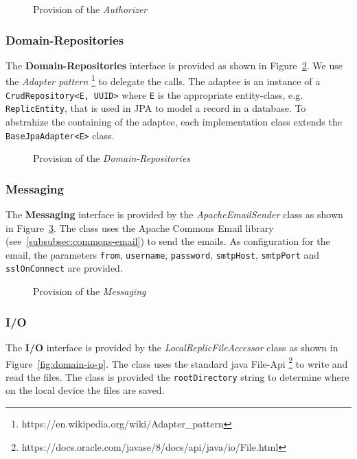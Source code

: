 \begin{figure}
    \centering

    \caption{Provision of the \textit{Authorizer}}
    \label{fig:inter-authorizer-p}
\end{figure}

\subsubsection{Domain-Repositories}
The \textbf{Domain-Repositories} interface is provided as shown in Figure~\ref{fig:domain-repositories-p}.
We use the \textit{Adapter pattern} \footnote{https://en.wikipedia.org/wiki/Adapter_pattern} to delegate the calls. \newline
The adaptee is an instance of a \texttt{CrudRepository<E, UUID>} where \texttt{E} is the appropriate entity-class, e.g. \texttt{ReplicEntity}, that is used in JPA to model a record in a database.
To abstrahize the containing of the adaptee, each implementation class extends the \texttt{BaseJpaAdapter<E>} class.

\begin{figure}
    \centering

    \caption{Provision of the \textit{Domain-Repositories}}
    \label{fig:domain-repositories-p}
\end{figure}

\subsubsection{Messaging}
The \textbf{Messaging} interface is provided by the \textit{ApacheEmailSender} class as shown in Figure~\ref{fig:domain-messaging-p}.
The class uses the Apache Commons Email library (see~\ref{subsubsec:commons-email}) to send the emails.
As configuration for the email, the parameters \texttt{from}, \texttt{username}, \texttt{password}, \texttt{smtpHost}, \texttt{smtpPort} and \texttt{sslOnConnect} are provided.

\begin{figure}
    \centering

    \caption{Provision of the \textit{Messaging}}
    \label{fig:domain-messaging-p}
\end{figure}

\subsubsection{I/O}
The \textbf{I/O} interface is provided by the \textit{LocalReplicFileAccessor} class as shown in Figure~\ref{fig:domain-io-p}.
The class uses the standard java File-Api \footnote{https://docs.oracle.com/javase/8/docs/api/java/io/File.html} to write and read the files.
The class is provided the \texttt{rootDirectory} string to determine where on the local device the files are saved.

